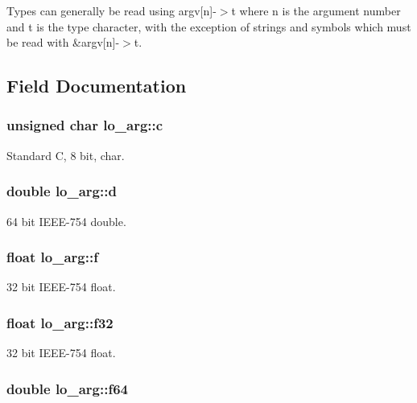 \-Types can generally be read using argv\mbox{[}n\mbox{]}-\/$>$t where n is the argument number and t is the type character, with the exception of strings and symbols which must be read with \&argv\mbox{[}n\mbox{]}-\/$>$t. 

\subsection{\-Field \-Documentation}
\hypertarget{unionlo__arg_aa2e1c99864cf46e6b9cc52fb5cb214fe}{
\subsubsection[{c}]{\setlength{\rightskip}{0pt plus 5cm}unsigned char {\bf lo\-\_\-arg\-::c}}}\label{unionlo__arg_aa2e1c99864cf46e6b9cc52fb5cb214fe}
\-Standard \-C, 8 bit, char. \hypertarget{unionlo__arg_a2a690890222baa5b9971f8772cb02535}{
\subsubsection[{d}]{\setlength{\rightskip}{0pt plus 5cm}double {\bf lo\-\_\-arg\-::d}}}\label{unionlo__arg_a2a690890222baa5b9971f8772cb02535}
64 bit \-I\-E\-E\-E-\/754 double. \hypertarget{unionlo__arg_ad61c0f83abb077ce656b3a39d5c7e19f}{
\subsubsection[{f}]{\setlength{\rightskip}{0pt plus 5cm}float {\bf lo\-\_\-arg\-::f}}}\label{unionlo__arg_ad61c0f83abb077ce656b3a39d5c7e19f}
32 bit \-I\-E\-E\-E-\/754 float. \hypertarget{unionlo__arg_a27ae2540e5e98e85826ccb7350b2ab20}{
\subsubsection[{f32}]{\setlength{\rightskip}{0pt plus 5cm}float {\bf lo\-\_\-arg\-::f32}}}\label{unionlo__arg_a27ae2540e5e98e85826ccb7350b2ab20}
32 bit \-I\-E\-E\-E-\/754 float. \hypertarget{unionlo__arg_abf90442900450bb63d8d9bb4e60af4ee}{
\subsubsection[{f64}]{\setlength{\rightskip}{0pt plus 5cm}double {\bf lo\-\_\-arg\-::f64}}}\label{unionlo__arg_abf90442900450bb63d8d9bb4e60af4ee}
